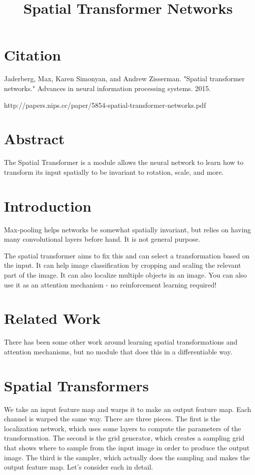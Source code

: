 \documentclass[a4paper]{article}
\title{Spatial Transformer Networks}
\date{}
\begin{document}
\maketitle

\section{Citation}

Jaderberg, Max, Karen Simonyan, and Andrew Zisserman. "Spatial transformer networks." Advances in neural information processing systems. 2015.

http://papers.nips.cc/paper/5854-spatial-transformer-networks.pdf

\section{Abstract}
The Spatial Transformer is a module allows the neural network to learn how to
transform its input spatially to be invariant to rotation, scale, and more.

\section{Introduction}
Max-pooling helps networks be somewhat spatially invariant, but relies on having
many convolutional layers before hand. It is not general purpose.

The spatial transformer aims to fix this and can select a transformation based
on the input. It can help image classification by cropping and scaling the
relevant part of the image. It can also localize multiple objects in an image.
You can also use it as an attention mechanism - no reinforcement learning 
required!

\section{Related Work}
There has been some other work around learning spatial transformations and
attention mechanisms, but no module that does this in a differentiable way.

\section{Spatial Transformers}
We take an input feature map and warps it to make an output feature map. Each
channel is warped the same way. There are three pieces. The first is the 
localization network, which uses some layers to compute the parameters of
the transformation. The second is the grid generator, which creates a sampling
grid that shows where to sample from the input image in order to produce the
output image. The third is the sampler, which actually does the sampling
and makes the output feature map. Let's consider each in detail.
\end{document}
